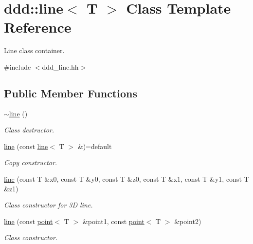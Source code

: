 \hypertarget{classddd_1_1line}{}\section{ddd\+:\+:line$<$ T $>$ Class Template Reference}
\label{classddd_1_1line}


Line class container.  




{\ttfamily \#include $<$ddd\+\_\+line.\+hh$>$}

\subsection*{Public Member Functions}
\begin{DoxyCompactItemize}
\item 
\mbox{\label{classddd_1_1line_a456f8a87d73fbc2aaf27c502bec653e3}} 
\hyperlink{classddd_1_1line_a456f8a87d73fbc2aaf27c502bec653e3}{$\sim$line} ()
\begin{DoxyCompactList}\small\item\em Class destructor. \end{DoxyCompactList}\item 
\mbox{\label{classddd_1_1line_a0a87f672568157869bbf2aa6c4f78395}} 
\hyperlink{classddd_1_1line_a0a87f672568157869bbf2aa6c4f78395}{line} (const \hyperlink{classddd_1_1line}{line}$<$ T $>$ \&)=default
\begin{DoxyCompactList}\small\item\em Copy constructor. \end{DoxyCompactList}\item 
\mbox{\label{classddd_1_1line_aeed42ee3ff157ff44dd237943f515c0f}} 
\hyperlink{classddd_1_1line_aeed42ee3ff157ff44dd237943f515c0f}{line} (const T \&x0, const T \&y0, const T \&z0, const T \&x1, const T \&y1, const T \&z1)
\begin{DoxyCompactList}\small\item\em Class constructor for 3D line. \end{DoxyCompactList}\item 
\hyperlink{classddd_1_1line_a1b5a2bea42f89d3d77bde14f49f072d9}{line} (const \hyperlink{classddd_1_1point}{point}$<$ T $>$ \&point1, const \hyperlink{classddd_1_1point}{point}$<$ T $>$ \&point2)
\begin{DoxyCompactList}\small\item\em Class constructor. \end{DoxyCompactList}\item 

\end{DoxyCompactItemize}
